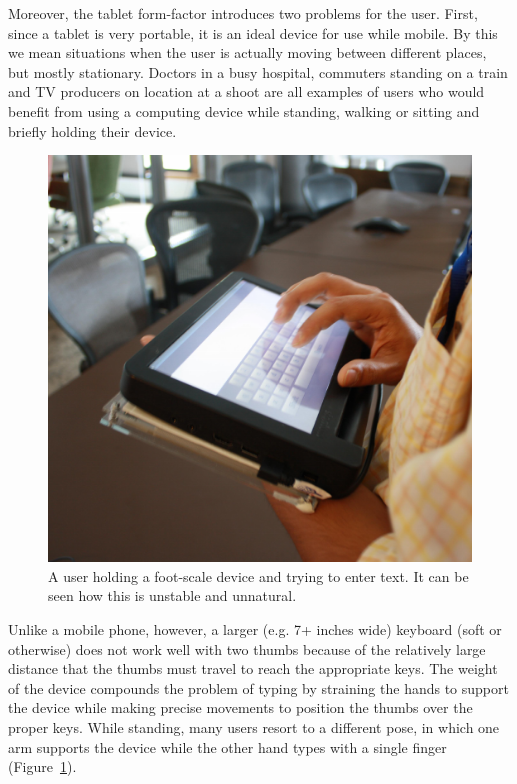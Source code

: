 Moreover, the tablet form-factor introduces two problems for the user.
First, since a tablet is very portable, it is an ideal device for use
while mobile. By this we mean situations when the user is actually moving between different places, but mostly stationary. Doctors in a busy hospital,
commuters standing on a train and TV producers on location at a shoot
are all examples of users who would benefit from using a computing
device while standing, walking or sitting and briefly holding their
device.
\begin{figure}
    \includegraphics[scale=0.35]{Figures/device_hold.pdf} 
  	\caption{A user holding a foot-scale device and trying to enter text. It can be seen how this is unstable and unnatural.}
    \label{fig:device_hold}
\end{figure}
Unlike a mobile phone, however, a larger (e.g. 7+ inches wide)
keyboard (soft or otherwise) does not work well with two thumbs
because of the relatively large distance that the thumbs must travel
to reach the appropriate keys.   The weight of the device compounds
the problem of typing by straining the hands to support the device
while making precise movements to position the thumbs over the proper
keys. While standing, many users resort to a different pose, in which
one arm supports the device while the other hand types with a single
finger (Figure~\ref{fig:device_hold}). 

